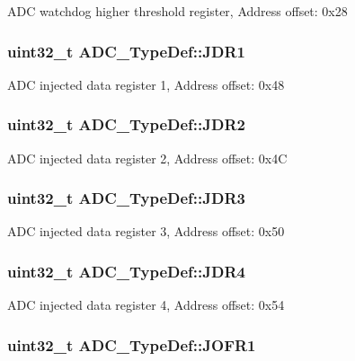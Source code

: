 A\-D\-C watchdog higher threshold register, Address offset\-: 0x28 \hypertarget{struct_a_d_c___type_def_ab4b0a79a9e4a9d5b0a24d7285cf55bdc}{
\subsubsection[{J\-D\-R1}]{ uint32\-\_\-t A\-D\-C\-\_\-\-Type\-Def\-::\-J\-D\-R1}}\label{struct_a_d_c___type_def_ab4b0a79a9e4a9d5b0a24d7285cf55bdc}
A\-D\-C injected data register 1, Address offset\-: 0x48 \hypertarget{struct_a_d_c___type_def_a898b87cab4f099bcca981cc4c9318b51}{
\subsubsection[{J\-D\-R2}]{ uint32\-\_\-t A\-D\-C\-\_\-\-Type\-Def\-::\-J\-D\-R2}}\label{struct_a_d_c___type_def_a898b87cab4f099bcca981cc4c9318b51}
A\-D\-C injected data register 2, Address offset\-: 0x4\-C \hypertarget{struct_a_d_c___type_def_a40999cd0a255ef62b2340e2726695063}{
\subsubsection[{J\-D\-R3}]{ uint32\-\_\-t A\-D\-C\-\_\-\-Type\-Def\-::\-J\-D\-R3}}\label{struct_a_d_c___type_def_a40999cd0a255ef62b2340e2726695063}
A\-D\-C injected data register 3, Address offset\-: 0x50 \hypertarget{struct_a_d_c___type_def_abae6e9d688b16ef350878998f5e21c0b}{
\subsubsection[{J\-D\-R4}]{ uint32\-\_\-t A\-D\-C\-\_\-\-Type\-Def\-::\-J\-D\-R4}}\label{struct_a_d_c___type_def_abae6e9d688b16ef350878998f5e21c0b}
A\-D\-C injected data register 4, Address offset\-: 0x54 \hypertarget{struct_a_d_c___type_def_aa005e656f528aaad28d70d61c9db9b81}{
\subsubsection[{J\-O\-F\-R1}]{ uint32\-\_\-t A\-D\-C\-\_\-\-Type\-Def\-::\-J\-O\-F\-R1}}\label{struct_a_d_c___type_def_aa005e656f528aaad28d70d61c9db9b81}
